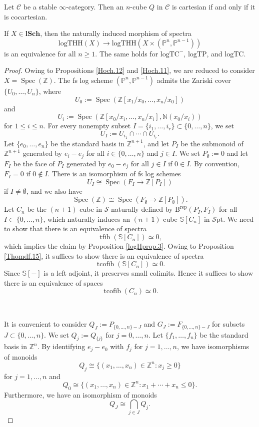 \documentclass[10pt,a4paper]{amsart}
\newcommand{\Brep}{\operatorname{B^{rep}}}
\newcommand{\N}{\mathbb{N}}
\renewcommand{\P}{\mathbb{P}}
\providecommand{\Spec}[1]{\operatorname{Spec}(#1)} 	%
\newcommand{\Sphere}{\mathbb{S}}
\newcommand{\Z}{\mathbb{Z}}
\newcommand{\cC}{\mathcal{C}}
\newcommand{\infSpc}{\mathcal{S}}
\newcommand{\infSpt}{\mathcal{S}\mathrm{pt}}
\newcommand{\lSch}{\mathbf{lSch}}
\newcommand{\logTC}{\mathrm{logTC}}
\newcommand{\logTHH}{\mathrm{logTHH}}
\newcommand{\logTP}{\mathrm{logTP}}
\newcommand{\tcofib}{\operatorname{tcofib}}
\newcommand{\tfib}{\operatorname{tfib}}
\begin{document}
\begin{prop}
\label{Thomdf.15}
Let $\cC$ be a stable $\infty$-category.
Then an $n$-cube $Q$ in $\cC$ is cartesian if and only if it is cocartesian.
\end{prop}

\begin{thm}
\label{Hoch.13}
If $X\in \lSch$, then the naturally induced morphism of spectra
\[
\logTHH(X)
\to
\logTHH(X\times (\P^n,\P^{n-1}))
\]
is an equivalence for all $n\geq 1$.
The same holds for $\logTC^-$, $\logTP$, and $\logTC$.
\end{thm}

\begin{proof}
Owing to Propositions \ref{Hoch.12} and \ref{Hoch.11}, we are reduced to consider $X=\Spec{\Z}$.
The fs log scheme $(\P^n,\P^{n-1})$ admits the Zariski cover $\{U_0,\ldots,U_n\}$,
where
\[
U_0:=\Spec{\Z[x_1/x_0,\ldots,x_n/x_0]}
\]
and
\[
U_i:=\Spec{\Z[x_0/x_i,\ldots,x_n/x_i],\N(x_0/x_i)}
\]
for $1\leq i\leq n$.
For every nonempty subset $I=\{i_1,\ldots,i_r\}\subset \{0,\ldots,n\}$, we set
\[
U_I:=U_{i_1}\cap \cdots \cap U_{i_r}.
\]
Let $\{e_0,\ldots,e_n\}$ be the standard basis in $\Z^{n+1}$, 
and let $P_I$ be the submonoid of $\Z^{n+1}$ generated by $e_i-e_j$ for all $i\in \{0,\ldots,n\}$ and $j\in I$.
We set $P_\emptyset := 0$ and let 
$F_I$ be the face of $P_I$ generated by $e_0-e_j$ for all $j\in I$ if $0\in I$.
By convention, 
$F_I=0$ if $0\notin I$.
There is an isomorphism of fs log schemes
\[
U_I
\cong
\Spec{F_I\to \Z[P_I]}
\]
if $I\neq \emptyset$, 
and we also have
\[
\Spec{\Z}
\cong
\Spec{F_\emptyset \to \Z[P_\emptyset]}.
\]
Let $C_n$ be the $(n+1)$-cube in $\infSpc$ naturally defined by $\Brep(P_I,F_I)$ for all $I\subset \{0,\ldots,n\}$,
which naturally induces an $(n+1)$-cube $\Sphere[C_n]$ in $\infSpt$.
We need to show that there is an equivalence of spectra
\[
\tfib(\Sphere[C_n])
\simeq
0,
\]
which implies the claim by Proposition \ref{logHprop.3}.
Owing to Proposition \ref{Thomdf.15}, it suffices to show there is an equivalence of spectra
\[
\tcofib(\Sphere[C_n])
\simeq
0.
\]
Since $\Sphere[-]$ is a left adjoint,
it preserves small colimits.
Hence it suffices to show there is an equivalence of spaces
\begin{equation}
\label{Hoch.13.6}
\tcofib(C_n)
\simeq
0.
\end{equation}

\

It is convenient to consider $Q_J:=P_{\{0,\ldots,n\}-J}$ and $G_J:=F_{\{0,\ldots,n\}-J}$ for subsets 
$J\subset \{0,\ldots,n\}$.
We set $Q_j:=Q_{\{j\}}$ for $j=0,\ldots,n$.
Let $\{f_1,\ldots,f_n\}$ be the standard basis in $\Z^n$.
By identifying $e_j-e_0$ with $f_j$ for $j=1,\ldots,n$, we have isomorphisms of monoids
\[
Q_j
\cong
\{ (x_1,\ldots,x_n)\in \Z^n : x_j\geq 0 \}
\]
for $j=1,\ldots,n$ and
\[
Q_0
\cong
\{ (x_1,\ldots,x_n)\in \Z^n : x_1+\cdots+x_n \leq 0\}.
\]
Furthermore, we have an isomorphism of monoids
\[
Q_J
\cong
\bigcap_{j\in J} Q_j.
\]


\end{proof}
\end{document}
